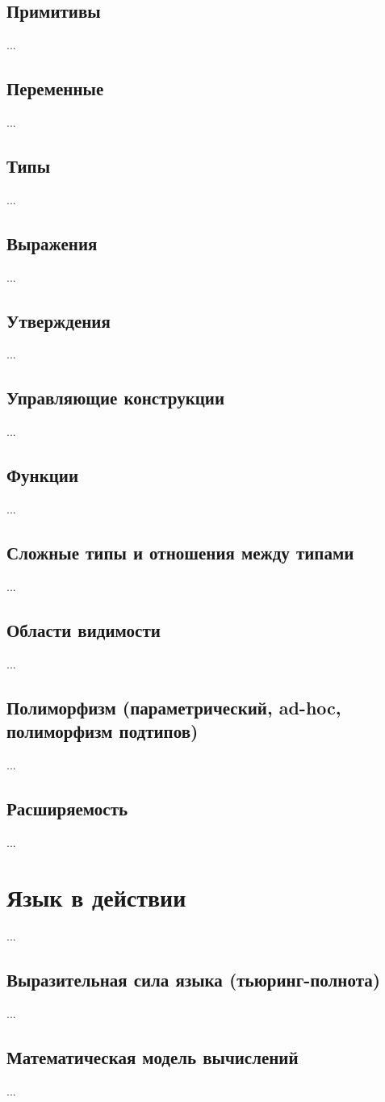 \documentclass[11pt]{book}
\begin{document}
\subsection{Примитивы}
...
\subsection{Переменные}
...
\subsection{Типы}
...
\subsection{Выражения}
...
\subsection{Утверждения}
...
\subsection{Управляющие конструкции}
...
\subsection{Функции}
...
\subsection{Сложные типы и отношения между типами}
...
\subsection{Области видимости}
...
\subsection{Полиморфизм (параметрический, ad-hoc, полиморфизм подтипов)}
...
\subsection{Расширяемость}
...
\section{Язык в действии}
...
\subsection{Выразительная сила языка (тьюринг-полнота)}
...
\subsection{Математическая модель вычислений}
...
\end{document}
